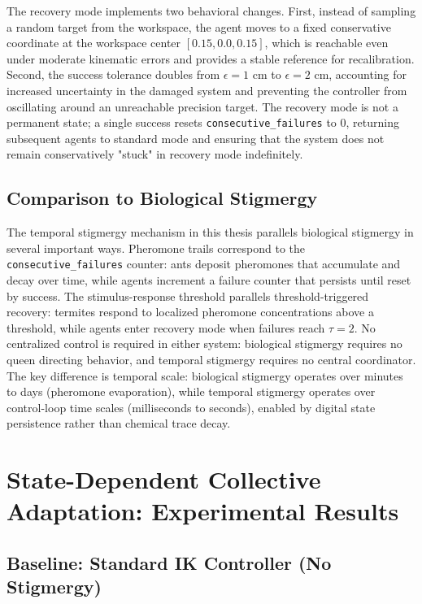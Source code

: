 \documentclass[12pt,a4paper,oneside]{report}
\begin{document}
The recovery mode implements two behavioral changes. First, instead of sampling a random target from the workspace, the agent moves to a fixed conservative coordinate at the workspace center $[0.15, 0.0, 0.15]$, which is reachable even under moderate kinematic errors and provides a stable reference for recalibration. Second, the success tolerance doubles from $\epsilon = 1$ cm to $\epsilon = 2$ cm, accounting for increased uncertainty in the damaged system and preventing the controller from oscillating around an unreachable precision target. The recovery mode is not a permanent state; a single success resets \texttt{consecutive\_failures} to 0, returning subsequent agents to standard mode and ensuring that the system does not remain conservatively "stuck" in recovery mode indefinitely.

\subsection{Comparison to Biological Stigmergy}
\label{subsec:comparison_to_biological_stigmergy}

The temporal stigmergy mechanism in this thesis parallels biological stigmergy in several important ways. Pheromone trails correspond to the \texttt{consecutive\_failures} counter: ants deposit pheromones that accumulate and decay over time, while agents increment a failure counter that persists until reset by success. The stimulus-response threshold parallels threshold-triggered recovery: termites respond to localized pheromone concentrations above a threshold, while agents enter recovery mode when failures reach $\tau = 2$. No centralized control is required in either system: biological stigmergy requires no queen directing behavior, and temporal stigmergy requires no central coordinator. The key difference is temporal scale: biological stigmergy operates over minutes to days (pheromone evaporation), while temporal stigmergy operates over control-loop time scales (milliseconds to seconds), enabled by digital state persistence rather than chemical trace decay.

\section{State-Dependent Collective Adaptation: Experimental Results}

\subsection{Baseline: Standard IK Controller (No Stigmergy)}
\label{subsec:baseline_standard_ik_controller_no_stigmergy}
\end{document}
